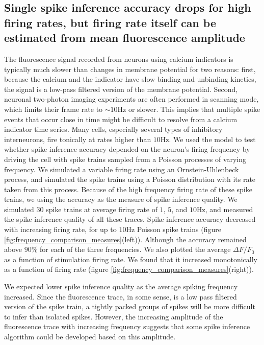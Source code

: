 \subsection{Single spike inference accuracy drops for high firing rates, but firing rate itself can be estimated from mean fluorescence amplitude}
The fluorescence signal recorded from neurons using calcium indicators is typically much slower than changes in membrane potential for two reasons: first, because the calcium and the indicator have slow binding and unbinding kinetics, the signal is a low-pass filtered version of the membrane potential. Second, neuronal two-photon imaging experiments are often performed in scanning mode, which limits their frame rate to $\sim 10$Hz or slower. This implies that multiple spike events that occur close in time might be difficult to resolve from a calcium indicator time series. Many cells, especially several types of inhibitory interneurons, fire tonically at rates higher than $10$Hz. We used the model to test whether spike inference accuracy depended on the neuron’s firing frequency by driving the cell with spike trains sampled from a Poisson processes of varying frequency. We simulated a variable firing rate using an Ornstein-Uhlenbeck process, and simulated the spike trains using a Poisson distribution with its rate taken from this process. Because of the high frequency firing rate of these spike trains, we using the accuracy as the measure of spike inference quality. We simulated $30$ spike trains at average firing rate of $1$, $5$, and $10$Hz, and measured the spike inference quality of all these traces. Spike inference accuracy decreased with increasing firing rate, for up to $10$Hz Poisson spike trains (figure \ref{fig:frequency_comparison_measures}(left)). Although the accuracy remained above $90\%$ for each of the three frequencies. We also plotted the average $\Delta F/F_0$ as a function of stimulation firing rate. We found that it increased monotonically as a function of firing rate (figure \ref{fig:frequency_comparison_measures}(right)).

We expected lower spike inference quality as the average spiking frequency increased. Since the fluorescence trace, in some sense, is a low pass filtered version of the spike train, a tightly packed groups of spikes will be more difficult to infer than isolated spikes. However, the increasing amplitude of the fluorescence trace with increasing frequency suggests that some spike inference algorithm could be developed based on this amplitude.

